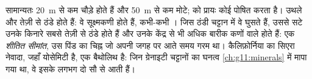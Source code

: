  सामान्यतः \qty{20}{m} से कम चौड़े होते हैं और  \qty{50}{m} से कम
मोटे;  को प्रायः कोई  पोषित करता है। उथले  और  तेज़ी से ठंडे होते हैं:
वे सूक्ष्मकणी होते हैं, कभी-कभी । जिस ठंडी चट्टान में वे
घुसते हैं, उससे सटे उनके किनारे सबसे तेज़ी से ठंडे होते हैं और
उनके केंद्र से भी अधिक बारीक कणों वाले होते हैं: एक \emph{शीतित सीमांत}, उस पिंड का चिह्न जो
अपनी जगह पर आते समय गरम था। कैलिफ़ोर्निया का सिएरा नेवादा, जहाँ योसेमिटी है,
एक बैथोलिथ है: जिन ग्रेनाइटी चट्टानों का घनत्व
\cref{ch:g11:minerals} में मापा गया था, वे इसके लगभग दो सौ  से आती हैं।

